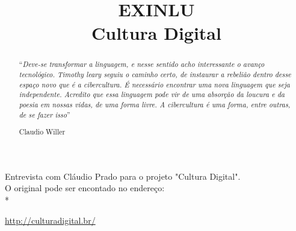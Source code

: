 %
%
%
%
%

% 
%
%
%
%
%
%
%
%
%

%
%

%
%
\pagestyle{empty}
%
\title{EXINLU \\ Cultura Digital} %
\author{}
\date{}
\maketitle
\renewcommand{\abstractname}{}
%
\begin{abstract}
\noindent``\emph{Deve-se transformar a linguagem, e nesse sentido acho 
interessante o avanço tecnológico. Timothy leary seguiu o caminho certo, 
de instaurar a rebelião dentro desse espaço novo que é a cibercultura. É 
necessário encontrar uma nova linguagem que seja independente. Acredito 
que essa linguagem pode vir de uma absorção da loucura e da poesia em 
nossas vidas, de uma forma livre. A cibercultura é uma forma, entre 
outras, de se fazer isso}''
\begin{flushright}Claudio Willer\end{flushright}
\end{abstract}
\vfill
\begin{small}
Entrevista com Cláudio Prado para o projeto "Cultura Digital".\\
O original pode ser encontado no endereço:\\*
\begin{flushright}\url{http://culturadigital.br/}\end{flushright}
\end{small}
\newpage %
%
%

